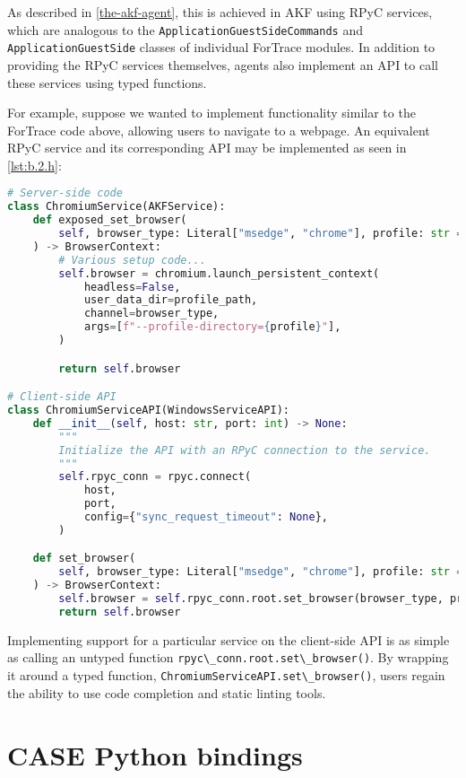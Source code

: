 As described in \autoref{the-akf-agent}, this is achieved in AKF using RPyC services, which are analogous
to the \passthrough{\lstinline!ApplicationGuestSideCommands!} and
\passthrough{\lstinline!ApplicationGuestSide!} classes of individual
ForTrace modules. In addition to providing the RPyC services themselves,
agents also implement an API to call these services using typed
functions.

For example, suppose we wanted to implement functionality similar to the
ForTrace code above, allowing users to navigate to a webpage. An
equivalent RPyC service and its corresponding API may be implemented as
seen in \autoref{lst:b.2.h}:

\begin{lstlisting}[label={lst:b.2.h}, caption={Minimal reimplementation of ForTrace module as an RPyC service}, language=Python]
# Server-side code
class ChromiumService(AKFService):
    def exposed_set_browser(
        self, browser_type: Literal["msedge", "chrome"], profile: str = "Default"
    ) -> BrowserContext:
        # Various setup code...
        self.browser = chromium.launch_persistent_context(
            headless=False,
            user_data_dir=profile_path,
            channel=browser_type,
            args=[f"--profile-directory={profile}"],
        )

        return self.browser

# Client-side API
class ChromiumServiceAPI(WindowsServiceAPI):
    def __init__(self, host: str, port: int) -> None:
        """
        Initialize the API with an RPyC connection to the service.
        """
        self.rpyc_conn = rpyc.connect(
            host,
            port,
            config={"sync_request_timeout": None},
        )

    def set_browser(
        self, browser_type: Literal["msedge", "chrome"], profile: str = "Default"
    ) -> BrowserContext:
        self.browser = self.rpyc_conn.root.set_browser(browser_type, profile)
        return self.browser
\end{lstlisting}

Implementing support for a particular service on the client-side API is
as simple as calling an untyped function
\passthrough{\lstinline!rpyc\_conn.root.set\_browser()!}. By wrapping it
around a typed function,
\passthrough{\lstinline!ChromiumServiceAPI.set\_browser()!}, users
regain the ability to use code completion and static linting tools.

\section{CASE Python bindings}\label{case-python-bindings}

